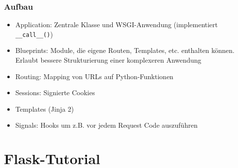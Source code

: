 \documentclass{beamer}
\begin{document}
\begin{frame}
  \frametitle{Aufbau}
  \begin{itemize}
    \item Application: Zentrale Klasse und WSGI-Anwendung (implementiert \lstinline{__call__()})
    \item Blueprints: Module, die eigene Routen, Templates, etc. enthalten können. Erlaubt bessere
          Strukturierung einer komplexeren Anwendung
    \item Routing: Mapping von URLs auf Python-Funktionen
    \item Sessions: Signierte Cookies
    \item Templates (Jinja 2)
    \item Signals: Hooks um z.B. vor jedem Request Code auszuführen
  \end{itemize}
\end{frame}

\section{Flask-Tutorial}
\end{document}
